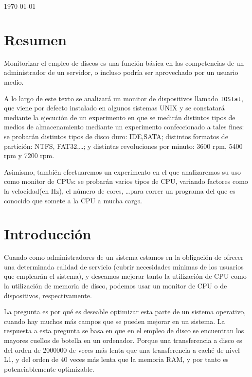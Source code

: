 \documentclass[a4paper,10pt]{article}
\newcommand{\imagent}[4]{
  \begin{figure}
    \begin{center}
    \texttt{[image: \#1]}
    \end{center}
    \caption{#3}
    \label{#4}
  \end{figure}
}
\newcommand{\imagen}[4]{
  \begin{minipage}{\linewidth}
    \centering
    \texttt{[image: \#1]}
    \captionof{figure}{#2}
    \label{#3}
  \end{minipage} 
}
\begin{document}
\begin{titlepage}
\vspace{\fill}%
\large\today
\end{titlepage}  

\newpage
\thispagestyle{empty}
\tableofcontents
\newpage
\setcounter{page}{1}


\section{Resumen}
Monitorizar el empleo de discos es una función básica en las competencias de un administrador de un servidor, o incluso
podría ser aprovechado por un usuario medio.

A lo largo de este texto se analizará un monitor de dispositivos llamado \texttt{IOStat}, que viene por defecto instalado
en algunos sistemas UNIX y se constatará mediante la ejecución de un experimento en que se medirán distintos tipos de medios 
de almacenamiento mediante un experimento confeccionado a tales fines: se probarán distintos tipos de disco
duro: IDE,SATA; distintos formatos de partición: NTFS, FAT32,\ldots; y distintas revoluciones por minuto: 3600 rpm, 5400 rpm y 7200 rpm.

Asimismo, también efectuaremos un experimento en el que analizaremos su uso como monitor de CPUs: se probarán varios
tipos de CPU, variando factores como la velocidad(en Hz), el número de cores, \ldots para correr un programa del que es
conocido que somete a la CPU a mucha carga.
\section{Introducción}
Cuando como administradores de un sistema estamos en la obligación de ofrecer una determinada calidad de servicio (cubrir
necesidades mínimas de los usuarios que emplearán el sistema), y deseamos mejorar tanto la utilización de CPU como la utilización de 
memoria de disco, podemos usar un monitor de CPU o de dispositivos, respectivamente.

La pregunta es por qué es deseable optimizar esta parte de un sistema operativo, cuando hay muchos más campos que se pueden
mejorar en un sistema. La respuesta a esta pregunta se basa en que en el empleo de disco se encuentran los mayores cuellos de
botella en un ordenador. Porque una transferencia a  disco es del orden de 2000000 de veces más lenta que una transferencia a
caché de nivel L1, y del orden de 40 veces más lenta que la memoria RAM, y por tanto es potenciablemente optimizable. \cite{conferencia}
\end{document}
